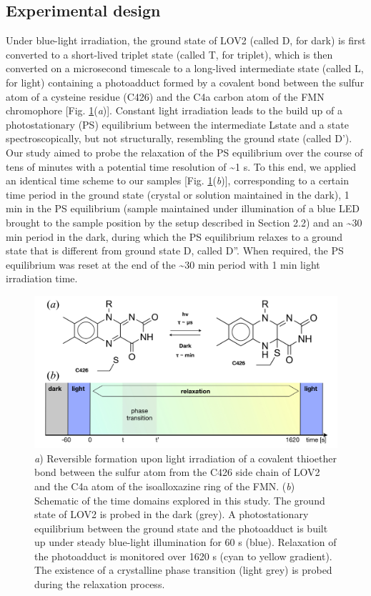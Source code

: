 \subsection{Experimental design}
Under blue-light irradiation, the ground state of LOV2 (called D, for dark) is first converted to a short-lived triplet state (called T, for triplet), which is then converted on a microsecond timescale to a long-lived intermediate state (called L, for light) containing a photoadduct formed by a covalent bond between the sulfur atom of a cysteine residue (C426) and the C4a carbon atom of the FMN chromophore [Fig. \ref{fig:LOV2slowexpscheme}(\textit{a})]. Constant light irradiation leads to the build up of a photostationary (PS) equilibrium between the intermediate Lstate and a state spectroscopically, but not structurally, resembling the ground state (called D'). Our study aimed to probe the relaxation of the PS equilibrium over the course of tens of minutes with a potential time resolution of \textasciitilde1 s. To this end, we applied an identical time scheme to our samples [Fig. \ref{fig:LOV2slowexpscheme}(\textit{b})], corresponding to a certain time period in the ground state (crystal or solution maintained in the dark), 1 min in the PS equilibrium (sample maintained under illumination of a blue LED brought to the sample position by the setup described in Section 2.2) and an \textasciitilde30 min period in the dark, during which the PS equilibrium relaxes to a ground state that is different from ground state D, called D''. When required, the PS equilibrium was reset at the end of the \textasciitilde30 min period with 1 min light irradiation time.

\begin{figure}[H] %
    \centering
    \noindent \includegraphics[width=\textwidth]{images/LOV2/LOV2slow_Fig1.pdf}
    \hfill
    \caption{\textit{a}) Reversible formation upon light irradiation of a covalent thioether bond between the sulfur atom from the C426 side chain of LOV2 and the C4a atom of the isoalloxazine ring of the FMN. (\textit{b}) Schematic of the time domains explored in this study. The ground state of LOV2 is probed in the dark (grey). A photostationary equilibrium between the ground state and the photoadduct is built up under steady blue-light illumination for 60 s (blue). Relaxation of the photoadduct is monitored over 1620 s (cyan to yellow gradient). The existence of a crystalline phase transition (light grey) is probed during the relaxation process.}
    \label{fig:LOV2slowexpscheme}
\end{figure}

